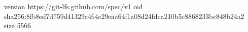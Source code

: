 version https://git-lfs.github.com/spec/v1
oid sha256:8fb8ed7d759d41329c464e29eaa64f1a08d24fdca210b5c8868233bc848b24a2
size 5566
